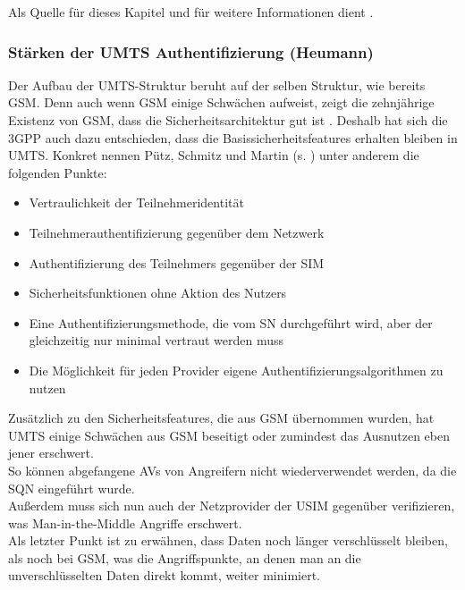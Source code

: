   Als Quelle für dieses Kapitel und für weitere Informationen dient \cite{3gpp.33.102}.
  
 \subsubsection{Stärken der UMTS Authentifizierung (Heumann)}
 Der Aufbau der \ac{UMTS}-Struktur beruht auf der selben Struktur, wie bereits \ac{GSM}.
 Denn auch wenn GSM einige Schwächen aufweist, zeigt die zehnjährige Existenz von GSM,
 dass die Sicherheitsarchitektur gut ist \cite{putz01}. Deshalb hat sich die \ac{3GPP} auch
 dazu entschieden, dass die Basis\-sicherheits\-features erhalten bleiben in UMTS. Konkret
 nennen Pütz, Schmitz und Martin (s. \cite{putz01}) unter anderem die folgenden Punkte:
 
 \begin{itemize}
  \item Vertraulichkeit der Teilnehmeridentität
  \item Teilnehmerauthentifizierung gegenüber dem Netzwerk
  \item Authentifizierung des Teilnehmers gegenüber der SIM
  \item Sicherheitsfunktionen ohne Aktion des Nutzers
  \item Eine Authentifizierungsmethode, die vom \ac{SN} durchgeführt wird, aber der gleichzeitig nur minimal vertraut werden muss
  \item Die Möglichkeit für jeden Provider eigene Authentifizierungsalgorithmen zu nutzen
 \end{itemize}
 
 Zusätzlich zu den Sicherheitsfeatures, die aus GSM übernommen wurden, hat UMTS einige
 Schwächen aus GSM beseitigt oder zumindest das Ausnutzen eben jener erschwert. \\
 So können abgefangene \acp{AV} von Angreifern nicht wiederverwendet werden, da
 die SQN eingeführt wurde. \cite{putz01}\\
 Außerdem muss sich nun auch der Netzprovider der USIM gegenüber verifizieren, was
 Man-in-the-Middle Angriffe erschwert. \cite{putz01} \\
 Als letzter Punkt ist zu erwähnen, dass Daten noch länger verschlüsselt bleiben, als noch
 bei GSM, was die Angriffspunkte, an denen man an die unverschlüsselten Daten direkt
 kommt, weiter minimiert. \cite{spitz11}


